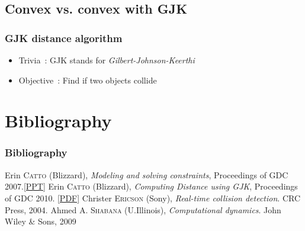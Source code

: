 \documentclass{beamer}
\begin{document}
\subsection{Convex vs. convex with GJK}
\begin{frame}
  \frametitle{GJK distance algorithm}
  \begin{itemize}
  \item Trivia~: GJK stands for \emph{Gilbert-Johnson-Keerthi}

  \item Objective~: Find if two objects collide

  \end{itemize}
\end{frame}

\section*{Bibliography}

\begin{frame}
 \frametitle{Bibliography} 
  \begin{thebibliography}{9}
   Erin \textsc{Catto} (Blizzard), \emph{Modeling and solving constraints}, Proceedings of GDC 2007.\href{http://box2d.org/files/GDC2007/GDC2007_Catto_Erin_Physics1.ppt}{[PPT]} 
   Erin \textsc{Catto} (Blizzard), \emph{Computing Distance using GJK}, Proceedings of GDC 2010. \href{http://box2d.org/files/GDC2010/GDC2010_Catto_Erin_GJK.pdf}{[PDF]}
   Christer \textsc{Ericson} (Sony), \emph{Real-time collision detection}. CRC Press, 2004.
   Ahmed A. \textsc{Shabana} (U.Illinois), \emph{Computational dynamics}. John Wiley \& Sons, 2009
  \end{thebibliography}
\end{frame}
\end{document}
